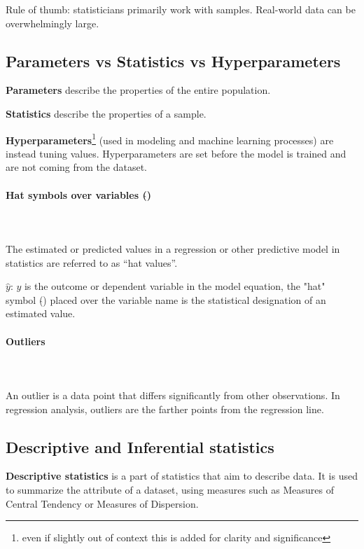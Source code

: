 \documentclass{article}
\begin{document}
Rule of thumb: statisticians primarily work with samples. Real-world data can be overwhelmingly large.

\subsection{Parameters vs Statistics vs Hyperparameters}

\textbf{Parameters} describe the properties of the entire population.

\textbf{Statistics} describe the properties of a sample.

\textbf{Hyperparameters}\footnote{even if slightly out of context this is added for clarity and significance} (used in modeling and machine learning processes) are instead tuning values. Hyperparameters are set before the model is trained and are not coming from the dataset. 

\paragraph{Hat symbols over variables ($\hat{}$)}\mbox{} \\ 
\mbox{} \\
The estimated or predicted values in a regression or other predictive model in statistics are referred to as “hat values”. 

$\hat{y}$: $y$ is the outcome or dependent variable in the model equation, the "hat" symbol ($\hat{}$) placed over the variable name is the statistical designation of an estimated value.

\paragraph{Outliers}\mbox{} \\ 
\mbox{} \\
An outlier is a data point that differs significantly from other observations. 
In regression analysis, outliers are the farther points from the regression line.

\subsection{Descriptive and Inferential statistics}

\textbf{Descriptive statistics} is a part of statistics that aim to describe data. It is used to summarize the attribute of a dataset, using measures such as Measures of Central Tendency or Measures of Dispersion.
\end{document}
